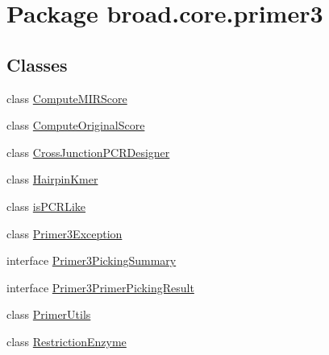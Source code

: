 \hypertarget{namespacebroad_1_1core_1_1primer3}{\section{Package broad.\+core.\+primer3}
\label{namespacebroad_1_1core_1_1primer3}
}
\subsection*{Classes}
\begin{DoxyCompactItemize}
\item 
class \hyperlink{classbroad_1_1core_1_1primer3_1_1_compute_m_i_r_score}{Compute\+M\+I\+R\+Score}
\item 
class \hyperlink{classbroad_1_1core_1_1primer3_1_1_compute_original_score}{Compute\+Original\+Score}
\item 
class \hyperlink{classbroad_1_1core_1_1primer3_1_1_cross_junction_p_c_r_designer}{Cross\+Junction\+P\+C\+R\+Designer}
\item 
class \hyperlink{classbroad_1_1core_1_1primer3_1_1_hairpin_kmer}{Hairpin\+Kmer}
\item 
class \hyperlink{classbroad_1_1core_1_1primer3_1_1is_p_c_r_like}{is\+P\+C\+R\+Like}
\item 
class \hyperlink{classbroad_1_1core_1_1primer3_1_1_primer3_exception}{Primer3\+Exception}
\item 
interface \hyperlink{interfacebroad_1_1core_1_1primer3_1_1_primer3_picking_summary}{Primer3\+Picking\+Summary}
\item 
interface \hyperlink{interfacebroad_1_1core_1_1primer3_1_1_primer3_primer_picking_result}{Primer3\+Primer\+Picking\+Result}
\item 
class \hyperlink{classbroad_1_1core_1_1primer3_1_1_primer_utils}{Primer\+Utils}
\item 
class \hyperlink{classbroad_1_1core_1_1primer3_1_1_restriction_enzyme}{Restriction\+Enzyme}
\end{DoxyCompactItemize}

